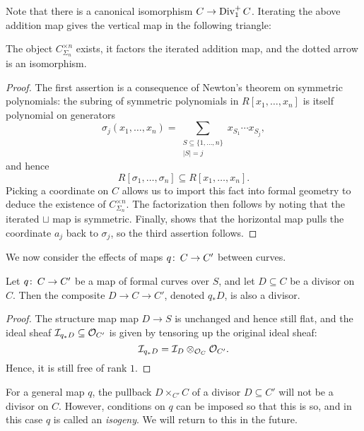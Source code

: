 Note that there is a canonical isomorphism $C \to \operatorname{Div}_1^+ C$.  Iterating the above addition map gives the vertical map in the following triangle:
\begin{center}
\end{center}
\begin{lemma}
The object $C^{\times n}_{\Sigma_n}$ exists, it factors the iterated addition map, and the dotted arrow is an isomorphism. 
\end{lemma}
\begin{proof}
The first assertion is a consequence of Newton's theorem on symmetric polynomials: the subring of symmetric polynomials in $R[x_1, \ldots, x_n]$ is itself polynomial on generators \[\sigma_j(x_1, \ldots, x_n) = \sum_{\substack{S \subseteq \{1, \ldots, n\} \\ |S| = j}} x_{S_1} \cdots x_{S_j},\] and hence \[R[\sigma_1, \ldots, \sigma_n] \subseteq R[x_1, \ldots, x_n].\]  Picking a coordinate on $C$ allows us to import this fact into formal geometry to deduce the existence of $C^{\times n}_{\Sigma_n}$.  The factorization then follows by noting that the iterated $\sqcup$ map is symmetric.  Finally,  shows that the horizontal map pulls the coordinate $a_j$ back to $\sigma_j$, so the third assertion follows.
\end{proof}

We now consider the effects of maps $q\colon\thinspace C \to C'$ between curves.
\begin{lemma}\label{DivHasPushforwards}
Let $q\colon\thinspace C \to C'$ be a map of formal curves over $S$, and let $D \subseteq C$ be a divisor on $C$.  Then the composite $D \to C \to C'$, denoted $q_* D$, is also a divisor.
\end{lemma}
\begin{proof}
The structure map map $D \to S$ is unchanged and hence still flat, and the ideal sheaf $\mathcal{I}_{q_* D} \subseteq \mathcal{O}_{C'}$ is given by tensoring up the original ideal sheaf: \[\mathcal{I}_{q_* D} = \mathcal{I}_D \otimes_{\mathcal{O}_C} \mathcal{O}_{C'}.\]  Hence, it is still free of rank $1$.
\end{proof}

\begin{remark}
For a general map $q$, the pullback $D \times_{C'} C$ of a divisor $D \subseteq C'$ will not be a divisor on $C$.  However, conditions on $q$ can be imposed so that this is so, and in this case $q$ is called an \textit{isogeny}.  We will return to this in the future.
\end{remark}

